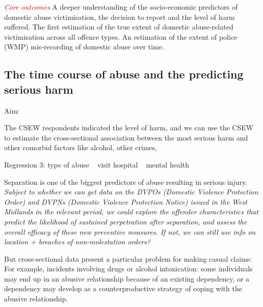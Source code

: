 \documentclass[11pt, a4paper]{article}
\begin{document}




\textcolor{red}{\textit{Core outcomes}} 
A deeper understanding of the socio-economic predictors of domestic abuse victimisation, the decision to report and the level of harm suffered. The first estimation of the true extent of domestic abuse-related victimisation across all offence types. An estimation of the extent of police (WMP) mis-recording of domestic abuse over time. 

\newpage


\subsection{The time course of abuse and the predicting serious harm}

Aim:

The CSEW respondents indicated the level of harm, and we can use the CSEW to estimate the cross-sectional association between the most serious harm and other comorbid factors like alcohol, other crimes, 

Regression 3: type of abuse ~ 
	visit hospital ~ 
	mental health ~ 

Separation is one of the biggest predictors of abuse resulting in serious injury. \textit{Subject to whether we can get data on the DVPOs (Domestic Violence Protection Order) and DVPNs (Domestic Violence Protection Notice) issued in the West Midlands in the relevant period, we could explore the offender characteristics that predict the likelihood of sustained perpetration after separation, and assess the overall efficacy of these new preventive measures. If not, we can still use info on location + breaches of non-molestation orders?}

But cross-sectional data present a particular problem for making casual claims: For example, incidents involving drugs or alcohol intoxication: some individuals may end up in an abusive relationship because of an existing dependency, or a dependency may develop as a counterproductive strategy of coping with the abusive relationship. 
\end{document}
